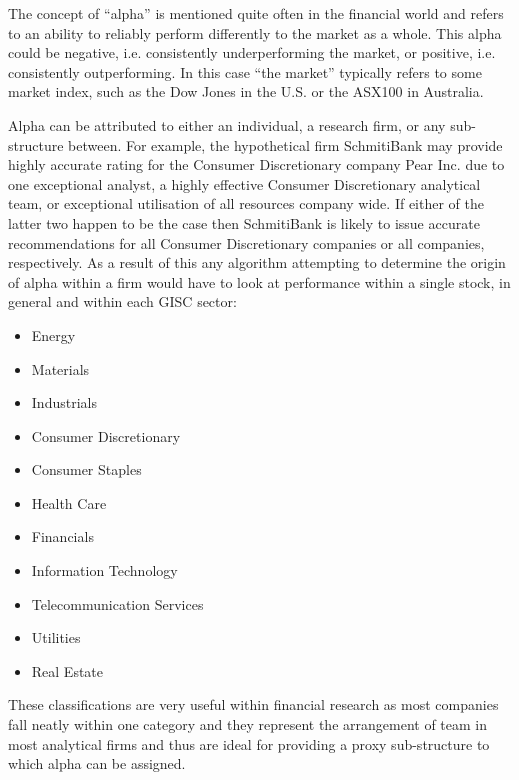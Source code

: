 The concept of ``alpha'' is mentioned quite often in the financial world and refers to an ability to reliably perform differently to the market as a whole. This alpha could be negative, i.e. consistently underperforming the market, or positive, i.e. consistently outperforming. In this case ``the market'' typically refers to some market index, such as the Dow Jones in the U.S. or the ASX100 in Australia.

Alpha can be attributed to either an individual, a research firm, or any sub-structure between. For example, the hypothetical firm SchmitiBank may provide highly accurate rating for the Consumer Discretionary company Pear Inc. due to one exceptional analyst, a highly effective Consumer Discretionary analytical team, or exceptional utilisation of all resources company wide. If either of the latter two happen to be the case then SchmitiBank is likely to issue accurate recommendations for all Consumer Discretionary companies or all companies, respectively. As a result of this any algorithm attempting to determine the origin of alpha within a firm would have to look at performance within a single stock, in general and within each GISC sector:
\begin{itemize}
    \item Energy
    \item Materials
    \item Industrials
    \item Consumer Discretionary
    \item Consumer Staples
    \item Health Care
    \item Financials
    \item Information Technology
    \item Telecommunication Services
    \item Utilities
    \item Real Estate
\end{itemize}
These classifications are very useful within financial research as most companies fall neatly within one category and they represent the arrangement of team in most analytical firms and thus are ideal for providing a proxy sub-structure to which alpha can be assigned. 